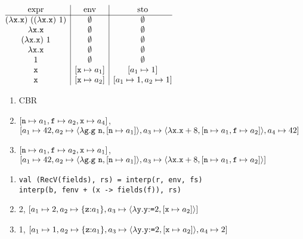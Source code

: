 \textbf{}

$
\begin{array}{@{}c|c|c@{}}
  \text{expr} & \text{env} & \text{sto} \\\hline
  \eapp{(\efun{\cx}{\cx})}{(\eapp{(\efun{\cx}{\cx})}{1})} & \emptyset & \emptyset \\
  \efun{\cx}{\cx} & \emptyset & \emptyset \\
  \eapp{(\efun{\cx}{\cx})}{1} & \emptyset & \emptyset \\
  \efun{\cx}{\cx} & \emptyset & \emptyset \\
  1 & \emptyset & \emptyset \\
  \cx & [\cx\mapsto a_1] & [a_1\mapsto1] \\
  \cx & [\cx\mapsto a_2] & [a_1\mapsto1,a_2\mapsto1] \\
\end{array}
$
\\

\textbf{}
\begin{enumerate}
  \item CBR
  \item
    $[\texttt{n} \mapsto a_1, \texttt{f} \mapsto a_2, \texttt{x} \mapsto a_4]$,\\
$[
    a_1 \mapsto 42,
    a_2 \mapsto \langle\lambda\texttt{g}.\texttt{g}\ \texttt{n},[\texttt{n} \mapsto a_1]\rangle,
    a_3 \mapsto \langle\lambda\texttt{x}.\texttt{x}+8,[\texttt{n} \mapsto a_1, \texttt{f} \mapsto a_2]\rangle,
    a_4 \mapsto 42
]$
  \item
    $[\texttt{n} \mapsto a_1, \texttt{f} \mapsto a_2, \texttt{x} \mapsto a_1]$,\\
$[
    a_1 \mapsto 42,
    a_2 \mapsto \langle\lambda\texttt{g}.\texttt{g}\ \texttt{n},[\texttt{n} \mapsto a_1]\rangle,
    a_3 \mapsto \langle\lambda\texttt{x}.\texttt{x}+8,[\texttt{n} \mapsto a_1, \texttt{f} \mapsto a_2]\rangle
]$
\end{enumerate}

\textbf{}
\begin{enumerate}
  \item
\begin{verbatim}
val (RecV(fields), rs) = interp(r, env, fs)
interp(b, fenv + (x -> fields(f)), rs)
\end{verbatim}
  \item 2,
    $[a_1 \mapsto 2, a_2 \mapsto \{\texttt{z}{:}a_1\}, a_3 \mapsto \langle\lambda\texttt{y}.\texttt{y}{:}\texttt{=}2,[\texttt{x} \mapsto a_2]\rangle]$
  \item 1,
    $[a_1 \mapsto 1, a_2 \mapsto \{\texttt{z}{:}a_1\}, a_3 \mapsto \langle\lambda\texttt{y}.\texttt{y}{:}\texttt{=}2,[\texttt{x} \mapsto a_2]\rangle, a_4 \mapsto 2]$
\end{enumerate}

